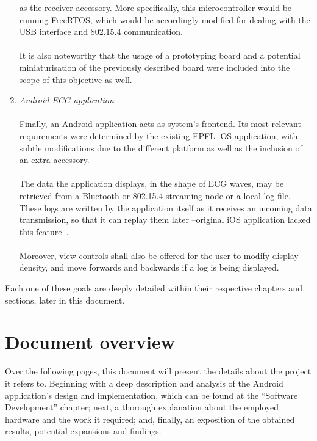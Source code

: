 \begin{enumerate}
				as the receiver accessory. More specifically, this microcontroller would be running FreeRTOS,
				which would be accordingly modified for dealing with the USB interface and 802.15.4 
				communication.\\\\
				It is also noteworthy that the usage of a prototyping board and a potential miniaturisation of
				the previously described board were included into the scope of this objective as well.\\
			\item \emph{Android ECG application}\\\\
				Finally, an Android application acts as system's frontend. Its most relevant requirements were
				determined by the existing EPFL iOS application, with subtle modifications due to the different
				platform as well as the inclusion of an extra accessory.\\\\
				The data the application displays, in the shape of ECG waves, may be retrieved from a Bluetooth
				or 802.15.4 streaming node or a local log file. These logs are written by the application itself
				as it receives an incoming data transmission, so that it can replay them later --original
				iOS application lacked this feature--.\\\\
				Moreover, view controls shall also be offered for the user to modify display density, and move
				forwards and backwards if a log is being displayed.\\
		\end{enumerate}
		Each one of these goals are deeply detailed within their respective chapters and sections, later in this
		document.
	
	\section{Document overview}
		Over the following pages, this document will present the details about the project it refers to.
		Beginning with a deep description and analysis of the Android application's design and implementation,
		which can be found at the ``Software Development'' chapter; next, a thorough explanation about the
		employed hardware and the work it required; and, finally, an exposition of the obtained results,
		potential expansions and findings.  

		

